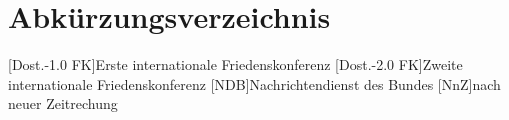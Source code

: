 \newpage
\thispagestyle{plain}
\chapter*{Abkürzungsverzeichnis}
\begin{acronym}
	[Dost.-1.0 FK]{Erste internationale Friedenskonferenz}
	[Dost.-2.0 FK]{Zweite internationale Friedenskonferenz}
	[NDB]{Nachrichtendienst des Bundes}
	[NnZ]{nach neuer Zeitrechung}
\end{acronym}


